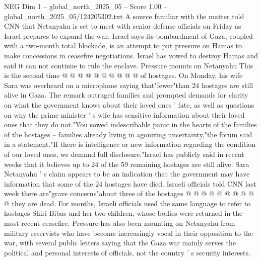 \begin{textsample}{NEG Dim 1 – global\_north\_2025\_05 – Score 1.00 – global\_north\_2025\_05/124205302.txt}
A source familiar with the matter told CNN that Netanyahu is set to meet with senior defense officials on Friday as Israel prepares to expand the war.
Israel says its bombardment of Gaza, coupled with a two-month total blockade, is an attempt to put pressure on Hamas to make concessions in ceasefire negotiations.
Israel has vowed to destroy Hamas and said it can not continue to rule the enclave.
Pressure mounts on Netanyahu This is the second time @ @ @ @ @ @ @ @ @ @ of hostages.
On Monday, his wife Sara was overheard on a microphone saying that"fewer"than 24 hostages are still alive in Gaza.
The remark outraged families and prompted demands for clarity on what the government knows about their loved ones ' fate, as well as questions on why the prime minister ' s wife has sensitive information about their loved ones that they do not."You sowed indescribable panic in the hearts of the families of the hostages -- families already living in agonizing uncertainty,"the forum said in a statement."If there is intelligence or new information regarding the condition of our loved ones, we demand full disclosure."Israel has publicly said in recent weeks that it believes up to 24 of the 59 remaining hostages are still alive.
Sara Netanyahu ' s claim appears to be an indication that the government may have information that some of the 24 hostages have died.
Israeli officials told CNN last week there are"grave concerns"about three of the hostages @ @ @ @ @ @ @ @ @ @ they are dead.
For months, Israeli officials used the same language to refer to hostages Shiri Bibas and her two children, whose bodies were returned in the most recent ceasefire.
Pressure has also been mounting on Netanyahu from military reservists who have become increasingly vocal in their opposition to the war, with several public letters saying that the Gaza war mainly serves the political and personal interests of officials, not the country ' s security interests.

\end{textsample}
